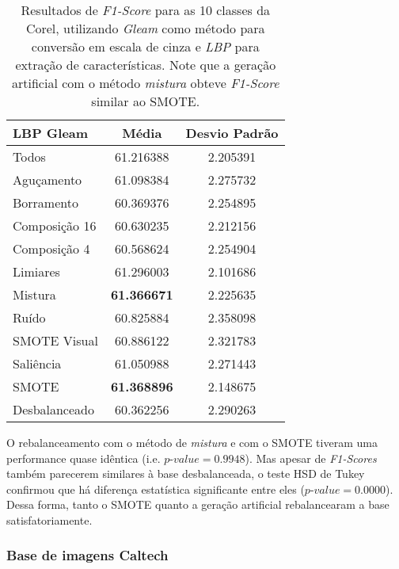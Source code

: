 \begin{table}[H]
\begin{center}
\caption{Resultados de \textit{F1-Score} para as 10 classes da Corel, utilizando \emph{Gleam} como método para conversão em escala de cinza e \emph{LBP} para extração de características. Note que a geração artificial com o método \emph{mistura} obteve \textit{F1-Score} similar ao SMOTE.}
\label{tab:resultados:3.1}
\begin{tabular}{|l|c|c|}
\hline
\textbf{LBP Gleam} & \textbf{Média}     & \textbf{Desvio Padrão} \\ \hline
   Todos        &  61.216388 &  2.205391  \\ \hline
  Aguçamento    &  61.098384 &  2.275732  \\ \hline
  Borramento    &  60.369376 &  2.254895  \\ \hline
  Composição 16 &  60.630235 &  2.212156  \\ \hline
  Composição 4  &  60.568624 &  2.254904  \\ \hline
  Limiares      &  61.296003 &  2.101686  \\ \hline
  Mistura       &  \textbf{61.366671} &  2.225635  \\ \hline
  Ruído         &  60.825884 &  2.358098  \\ \hline
  SMOTE Visual  &  60.886122 &  2.321783  \\ \hline
  Saliência     &  61.050988 &  2.271443  \\ \hline
 SMOTE          &  \textbf{61.368896} &  2.148675  \\ \hline
Desbalanceado   &  60.362256 &  2.290263  \\ \hline
\end{tabular}
\end{center}
\end{table}


O rebalanceamento com o método de \emph{mistura} e com o SMOTE tiveram uma performance quase idêntica (i.e. $\textit{p-value} = 0.9948$). Mas apesar de \textit{F1-Scores} também parecerem similares à base desbalanceada, o teste HSD de Tukey confirmou que há diferença estatística significante entre eles ($\textit{p-value} = 0.0000$). Dessa forma, tanto o SMOTE quanto a geração artificial rebalancearam a base satisfatoriamente.

\subsubsection{Base de imagens Caltech}

